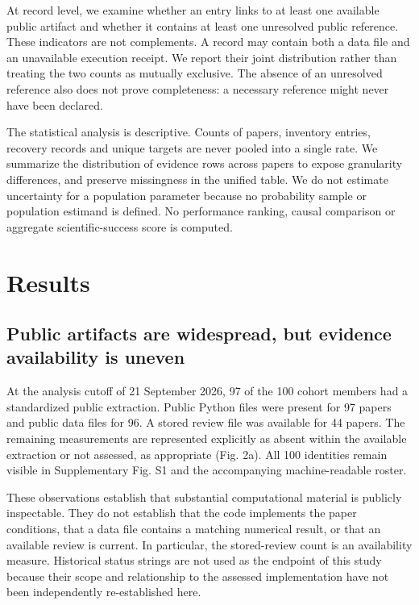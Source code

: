 \documentclass[10pt,a4paper]{article}
\begin{document}
At record level, we examine whether an entry links to at least one
available public artifact and whether it contains at least one
unresolved public reference. These indicators are not complements. A
record may contain both a data file and an unavailable execution
receipt. We report their joint distribution rather than treating the two
counts as mutually exclusive. The absence of an unresolved reference
also does not prove completeness: a necessary reference might never have
been declared.

The statistical analysis is descriptive. Counts of papers, inventory
entries, recovery records and unique targets are never pooled into a
single rate. We summarize the distribution of evidence rows across
papers to expose granularity differences, and preserve missingness in
the unified table. We do not estimate uncertainty for a population
parameter because no probability sample or population estimand is
defined. No performance ranking, causal comparison or aggregate
scientific-success score is computed.

\section{Results}\label{results}

\subsection{Public artifacts are widespread, but evidence availability
is
uneven}\label{public-artifacts-are-widespread-but-evidence-availability-is-uneven}

At the analysis cutoff of 21 September 2026, 97 of the 100 cohort
members had a standardized public extraction. Public Python files were
present for 97 papers and public data files for 96. A stored review file
was available for 44 papers. The remaining measurements are represented
explicitly as absent within the available extraction or not assessed, as
appropriate (Fig. 2a). All 100 identities remain visible in
Supplementary Fig. S1 and the accompanying machine-readable roster.

These observations establish that substantial computational material is
publicly inspectable. They do not establish that the code implements the
paper conditions, that a data file contains a matching numerical result,
or that an available review is current. In particular, the stored-review
count is an availability measure. Historical status strings are not used
as the endpoint of this study because their scope and relationship to
the assessed implementation have not been independently re-established
here.
\end{document}
